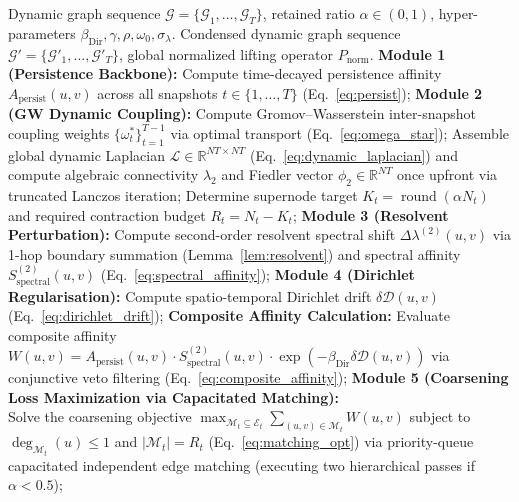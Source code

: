 \documentclass[sigconf]{acmart}
\begin{document}
\begin{algorithm}[t]
\caption{JST-Coarsen Dynamic Graph Coarsening Pipeline}
\label{alg:jst_coarsen}
\begin{algorithmic}[1]
\REQUIRE Dynamic graph sequence $\mathcal{G} = \{\mathcal{G}_1, \dots, \mathcal{G}_T\}$, retained ratio $\alpha \in (0, 1)$, hyper-parameters $\beta_{\text{Dir}}, \gamma, \rho, \omega_0, \sigma_\lambda$.
\ENSURE Condensed dynamic graph sequence $\mathcal{G}' = \{\mathcal{G}'_1, \dots, \mathcal{G}'_T\}$, global normalized lifting operator $P_{\text{norm}}$.
\STATE \textbf{Module 1 (Persistence Backbone):} Compute time-decayed persistence affinity $A_{\text{persist}}(u, v)$ across all snapshots $t \in \{1, \dots, T\}$ (Eq.~\eqref{eq:persist});
\STATE \textbf{Module 2 (GW Dynamic Coupling):} Compute Gromov--Wasserstein inter-snapshot coupling weights $\{\omega_t^*\}_{t=1}^{T-1}$ via optimal transport (Eq.~\eqref{eq:omega_star});
\STATE Assemble global dynamic Laplacian $\mathcal{L} \in \mathbb{R}^{NT \times NT}$ (Eq.~\eqref{eq:dynamic_laplacian}) and compute algebraic connectivity $\lambda_2$ and Fiedler vector $\phi_2 \in \mathbb{R}^{NT}$ once upfront via truncated Lanczos iteration;
    \STATE Determine supernode target $K_t = \operatorname{round}(\alpha N_t)$ and required contraction budget $R_t = N_t - K_t$;
        \STATE \textbf{Module 3 (Resolvent Perturbation):} Compute second-order resolvent spectral shift $\Delta \lambda^{(2)}(u, v)$ via 1-hop boundary summation (Lemma~\ref{lem:resolvent}) and spectral affinity $S_{\text{spectral}}^{(2)}(u, v)$ (Eq.~\eqref{eq:spectral_affinity});
        \STATE \textbf{Module 4 (Dirichlet Regularisation):} Compute spatio-temporal Dirichlet drift $\delta \mathcal{D}(u, v)$ (Eq.~\eqref{eq:dirichlet_drift});
        \STATE \textbf{Composite Affinity Calculation:} Evaluate composite affinity $W(u, v) = A_{\text{persist}}(u, v) \cdot S_{\text{spectral}}^{(2)}(u, v) \cdot \exp(-\beta_{\text{Dir}} \delta \mathcal{D}(u, v))$ via conjunctive veto filtering (Eq.~\eqref{eq:composite_affinity});
    \ENDFOR
    \STATE \textbf{Module 5 (Coarsening Loss Maximization via Capacitated Matching):} \\
    Solve the coarsening objective $\max_{\mathcal{M}_t \subseteq \mathcal{E}_t} \sum_{(u, v) \in \mathcal{M}_t} W(u, v)$ subject to $\operatorname{deg}_{\mathcal{M}_t}(u) \le 1$ and $|\mathcal{M}_t| = R_t$ (Eq.~\eqref{eq:matching_opt}) via priority-queue capacitated independent edge matching (executing two hierarchical passes if $\alpha < 0.5$);

\end{algorithmic}
\end{algorithm}
\end{document}
